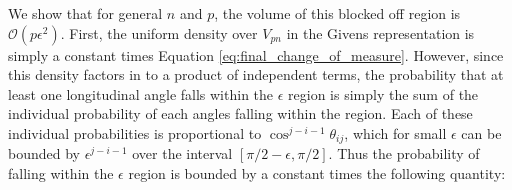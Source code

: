 \documentclass[ba]{imsart}
\numberwithin{equation}{section}
\theoremstyle{plain}
\begin{document}





\noindent We show that for general $n$ and $p$, the volume of this blocked off region is $\mathcal{O}(p \epsilon^2)$. First, the uniform density over $V_{pn}$ in the Givens representation is simply a constant times Equation \ref{eq:final_change_of_measure}. However, since this density factors in to a product of independent terms, the probability that at least one longitudinal angle falls within the $\epsilon$ region is simply the sum of the individual probability of each angles falling within the region. Each of these individual probabilities is proportional to $\cos^{j-i-1} \theta_{ij}$, which for small $\epsilon$ can be bounded by $\epsilon^{j-i-1}$ over the interval $[\pi/2 - \epsilon, \pi/2]$. Thus the probability of falling within the $\epsilon$ region is bounded by a constant times the following quantity:
\end{document}
